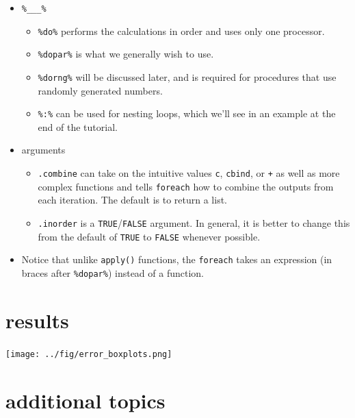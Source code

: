 \documentclass[]{article}
\begin{document}
\begin{itemize}
\itemsep1pt\parskip0pt
\item
  \texttt{\%\_\_\_\%}

  \begin{itemize}
  \itemsep1pt\parskip0pt
  \item
    \texttt{\%do\%} performs the calculations in order and uses only one
    processor.
  \item
    \texttt{\%dopar\%} is what we generally wish to use.
  \item
    \texttt{\%dorng\%} will be discussed later, and is required for
    procedures that use randomly generated numbers.
  \item
    \texttt{\%:\%} can be used for nesting loops, which we'll see in an
    example at the end of the tutorial.
  \end{itemize}
\item
  arguments

  \begin{itemize}
  \itemsep1pt\parskip0pt
  \item
    \texttt{.combine} can take on the intuitive values
    \texttt{\textquotesingle{}c\textquotesingle{}},
    \texttt{\textquotesingle{}cbind\textquotesingle{}}, or
    \texttt{\textquotesingle{}+\textquotesingle{}} as well as more
    complex functions and tells \texttt{foreach} how to combine the
    outputs from each iteration. The default is to return a list.
  \item
    \texttt{.inorder} is a \texttt{TRUE}/\texttt{FALSE} argument. In
    general, it is better to change this from the default of
    \texttt{TRUE} to \texttt{FALSE} whenever possible.
  \end{itemize}
\item
  Notice that unlike \texttt{apply()} functions, the \texttt{foreach}
  takes an expression (in braces after \texttt{\%dopar\%}) instead of a
  function.
\end{itemize}

\section{results}\label{results}

\texttt{[image: ../fig/error\_boxplots.png]}

\section{additional topics}\label{additional-topics}
\end{document}
